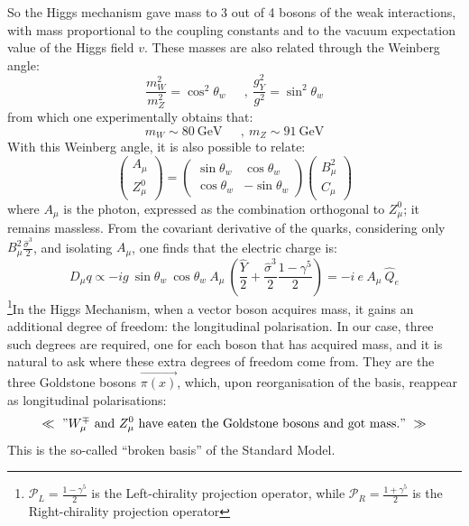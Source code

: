 \documentclass[11pt,a4paper,twoside,openright]{report}
\begin{document}
So the Higgs mechanism gave mass to 3 out of 4 bosons of the weak interactions, with mass proportional to the coupling constants and to the vacuum expectation value of the Higgs field $v$. These masses are also related through the Weinberg angle:
\begin{equation}
\frac{m_W^2}{m_Z^2}=\cos^2\theta_w\ \quad\ , \ \frac{g_Y^2}{g^2}=\sin^2\theta_w
\end{equation}
from which one experimentally obtains that:
\begin{equation}
m_W\sim 80\ \text{GeV}\ \quad\ , \ m_Z\sim 91\ \text{GeV}
\end{equation}
With this Weinberg angle, it is also possible to relate:
\begin{equation}
\begin{pmatrix} A_\mu \\ Z^0_\mu \end{pmatrix} = \begin{pmatrix} \sin\theta_w & \cos\theta_w \\ \cos\theta_w & -\sin\theta_w \end{pmatrix} \begin{pmatrix} B_\mu^2 \\ C_\mu \end{pmatrix}
\end{equation}
where \(A_\mu\) is the photon, expressed as the combination orthogonal to \(Z^0_\mu\); it remains massless. From the covariant derivative of the quarks, considering only \(B^2_\mu \frac{\hat{\sigma}^3}{2}\), and isolating \(A_\mu\), one finds that the electric charge is:
\begin{equation}
D_\mu q\propto-ig\ \sin\theta_w\ \cos\theta_w\ A_\mu\ \left( \frac{\hat{Y}}{2} +\frac{\hat{\sigma}^3}{2}\frac{1-\gamma^5}{2} \right) = -i\ e\ A_\mu\ \hat{Q}_e
\end{equation}
\footnote{$\mathcal{P}_L=\frac{1-\gamma^5}{2}$  is the Left-chirality projection operator, while $\mathcal{P}_R=\frac{1+\gamma^5}{2}$ is the Right-chirality projection operator}In the Higgs Mechanism, when a vector boson acquires mass, it gains an additional degree of freedom: the longitudinal polarisation. In our case, three such degrees are required, one for each boson that has acquired mass, and it is natural to ask where these extra degrees of freedom come from. They are the three Goldstone bosons \(\overrightarrow{\pi(x)}\), which, upon reorganisation of the basis, reappear as longitudinal polarisations:
\[\ll\ "W^\mp_\mu\ \text{and}\ Z^0_\mu\ \text{have eaten the Goldstone bosons and got mass.}"\ \gg \]
This is the so-called ``broken basis'' of the Standard Model.
\end{document}
